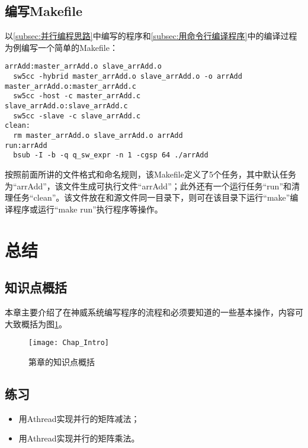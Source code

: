 \subsection{编写Makefile}\label{subsec:编写Makefile}
以\ref{subsec:并行编程思路}中编写的程序和\ref{subsec:用命令行编译程序}中的编译过程为例编写一个简单的Makefile：
\begin{lstlisting}
arrAdd:master_arrAdd.o slave_arrAdd.o
  sw5cc -hybrid master_arrAdd.o slave_arrAdd.o -o arrAdd
master_arrAdd.o:master_arrAdd.c
  sw5cc -host -c master_arrAdd.c
slave_arrAdd.o:slave_arrAdd.c
  sw5cc -slave -c slave_arrAdd.c
clean:
  rm master_arrAdd.o slave_arrAdd.o arrAdd
run:arrAdd
  bsub -I -b -q q_sw_expr -n 1 -cgsp 64 ./arrAdd
\end{lstlisting}

按照前面所讲的文件格式和命名规则，该Makefile定义了5个任务，其中默认任务为“arrAdd”，该文件生成可执行文件“arrAdd”；此外还有一个运行任务“run”和清理任务“clean”。该文件放在和源文件同一目录下，则可在该目录下运行“make”编译程序或运行“make run”执行程序等操作。

\section{总结}
\subsection{知识点概括}
本章主要介绍了在神威系统编写程序的流程和必须要知道的一些基本操作，内容可大致概括为图\ref{fig:Chap_Intro}。

\begin{figure}[!htbp]
  \centering
  \texttt{[image: Chap\_Intro]}
  \caption{第\thechapter{}章的知识点概括}
  \label{fig:Chap_Intro}
\end{figure}

\subsection{练习}
\begin{itemize}
  \item 用Athread实现并行的矩阵减法；
  \item 用Athread实现并行的矩阵乘法。
\end{itemize}